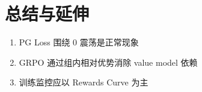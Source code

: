 \section{总结与延伸}
\begin{enumerate}
  \item PG Loss 围绕 0 震荡是正常现象
  \item GRPO 通过组内相对优势消除 value model 依赖
  \item 训练监控应以 Rewards Curve 为主
\end{enumerate}

